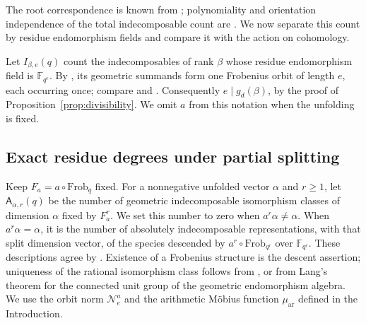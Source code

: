 \documentclass[11pt, reqno]{amsart}
\numberwithin{equation}{section}
\theoremstyle{definition}
\theoremstyle{remark}
\newcommand{\mr}[1]{\mathrm{#1}}
\newcommand{\mb}[1]{\mathbb{#1}}
\newcommand{\mc}[1]{\mathcal{#1}}
\begin{document}
The root correspondence is known from \cite{DengXiao}; polynomiality
and orientation independence of the total indecomposable count are
\cite[Corollary~9.2]{DengDu}. We now separate this count by residue
endomorphism fields and compare it with the action on cohomology.

Let $I_{\beta,e}(q)$ count the indecomposables of rank $\beta$
whose residue endomorphism field is $\mb F_{q^e}$. By
\cite[Theorem~5.1 and Corollary~5.2]{DengDu}, its geometric summands
form one Frobenius orbit of length $e$, each occurring once; compare
\cite[Lemma~8.4.6]{DWbook} and \cite[Lemma~19]{Hubery}.
Consequently $e\mid g_d(\beta)$, by the proof of
Proposition~\ref{prop:divisibility}. We omit $a$ from this notation
when the unfolding is fixed.

\subsection{Exact residue degrees under partial splitting}

Keep $F_a=a\circ\mr{Frob}_q$ fixed. For a nonnegative unfolded
vector $\alpha$ and $r\geq1$, let $\mathsf A_{\alpha,r}(q)$ be the number
of geometric indecomposable isomorphism classes of dimension
$\alpha$ fixed by $F_a^r$. We set this number to zero when
$a^r\alpha\ne\alpha$. When $a^r\alpha=\alpha$, it is the number
of absolutely indecomposable representations, with that split
dimension vector, of the species descended by
$a^r\circ\mr{Frob}_{q^r}$ over $\mb F_{q^r}$.
These descriptions agree by \cite[Corollary~5.4]{DengDu}.
Existence of a Frobenius structure is the descent assertion; uniqueness
of the rational isomorphism class follows from
\cite[Lemma~3.1]{DengDu}, or from Lang's theorem for the connected
unit group of the geometric endomorphism algebra.
We use the orbit norm $\mc N_e^a$ and the arithmetic
M\"obius function $\mu_{\mr{ar}}$ defined in the Introduction.
\end{document}
